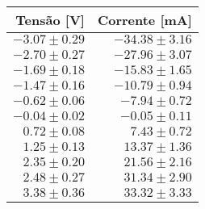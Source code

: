 \begin{tabular}{rr}
\toprule
       Tensão [V] &      Corrente [mA] \\
\midrule
 $-3.07 \pm 0.29$ &  $-34.38 \pm 3.16$ \\
 $-2.70 \pm 0.27$ &  $-27.96 \pm 3.07$ \\
 $-1.69 \pm 0.18$ &  $-15.83 \pm 1.65$ \\
 $-1.47 \pm 0.16$ &  $-10.79 \pm 0.94$ \\
 $-0.62 \pm 0.06$ &   $-7.94 \pm 0.72$ \\
 $-0.04 \pm 0.02$ &   $-0.05 \pm 0.11$ \\
  $0.72 \pm 0.08$ &    $7.43 \pm 0.72$ \\
  $1.25 \pm 0.13$ &   $13.37 \pm 1.36$ \\
  $2.35 \pm 0.20$ &   $21.56 \pm 2.16$ \\
  $2.48 \pm 0.27$ &   $31.34 \pm 2.90$ \\
  $3.38 \pm 0.36$ &   $33.32 \pm 3.33$ \\
\bottomrule
\end{tabular}
